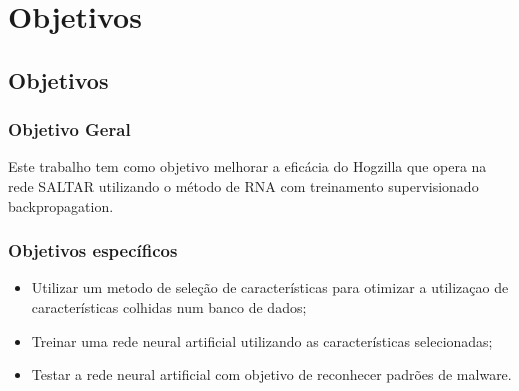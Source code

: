\part{Objetivos}
\chapter[Objetivos]{Objetivos}

\section{Objetivo Geral}
    Este trabalho tem como objetivo melhorar a eficácia do Hogzilla que opera na rede SALTAR utilizando o método de RNA com treinamento supervisionado backpropagation.


\section{Objetivos específicos}
    \begin{itemize}
        \item Utilizar um metodo de seleção de características para otimizar a utilizaçao de características colhidas num banco de dados;
        \item Treinar uma rede neural artificial utilizando as características selecionadas;
        \item Testar a rede neural artificial com objetivo de reconhecer padrões de malware.
    \end{itemize}